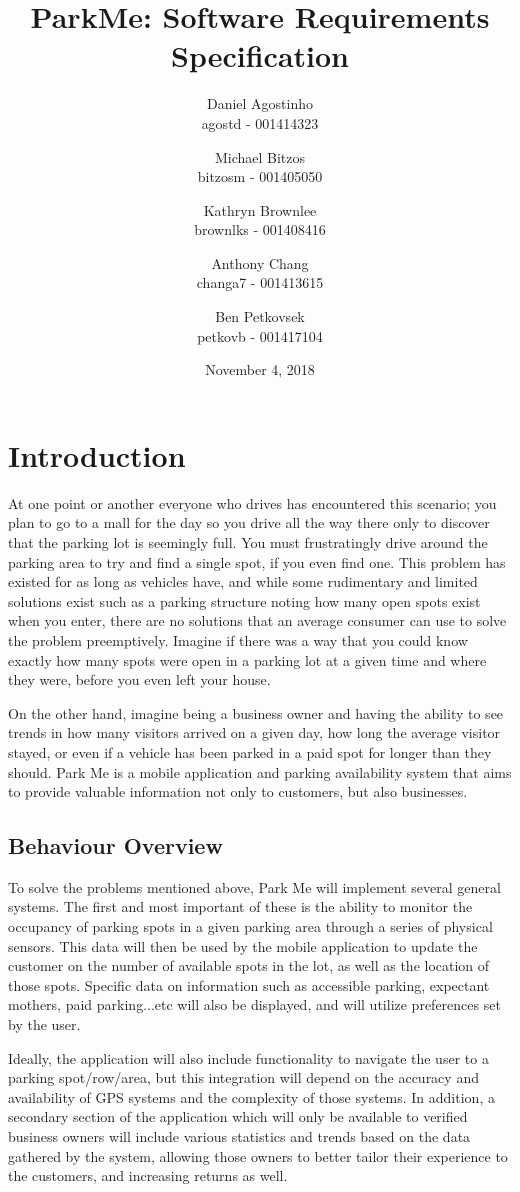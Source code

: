 \documentclass[]{article}
\title{ParkMe: Software Requirements Specification}
\author{Daniel Agostinho\\agostd - 001414323 \and Michael Bitzos\\bitzosm - 001405050 \and Kathryn Brownlee\\brownlks - 001408416  \and Anthony Chang\\changa7 - 001413615 \and Ben Petkovsek\\petkovb - 001417104}
\begin{document}
\date{November 4, 2018}
\maketitle
\newpage
\tableofcontents
\newpage

\section{Introduction}
At one point or another everyone who drives has encountered this scenario; you plan to go to a mall for the day so you drive all the way there only to discover that the parking lot is seemingly full. You must frustratingly drive around the parking area to try and find a single spot, if you even find one. This problem has existed for as long as vehicles have, and while some rudimentary and limited solutions exist such as a parking structure noting how many open spots exist when you enter, there are no solutions that an average consumer can use to solve the problem preemptively. Imagine if there was a way that you could know exactly how many spots were open in a parking lot at a given time and where they were, before you even left your house. 

On the other hand, imagine being a business owner and having the ability to see trends in how many visitors arrived on a given day, how long the average visitor stayed, or even if a vehicle has been parked in a paid spot for longer than they should. Park Me is a mobile application and parking availability system that aims to provide valuable information not only to customers, but also businesses.


\subsection{Behaviour Overview}
To solve the problems mentioned above, Park Me will implement several general systems. The first and most important of these is the ability to monitor the occupancy of parking spots in a given parking area through a series of physical sensors. This data will then be used by the mobile application to update the customer on the number of available spots in the lot, as well as the location of those spots. Specific data on information such as accessible parking, expectant mothers, paid parking...etc will also be displayed, and will utilize preferences set by the user. 

Ideally, the application will also include functionality to navigate the user to a parking spot/row/area, but this integration will depend on the accuracy and availability of GPS systems and the complexity of those systems. In addition, a secondary section of the application which will only be available to verified business owners will include various statistics and trends based on the data gathered by the system, allowing those owners to better tailor their experience to the customers, and increasing returns as well.
\end{document}

